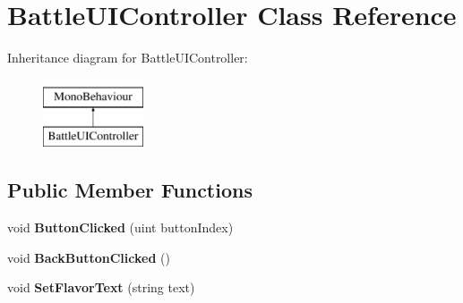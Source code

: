 \hypertarget{class_battle_u_i_controller}{\section{Battle\-U\-I\-Controller Class Reference}
\label{class_battle_u_i_controller}
}
Inheritance diagram for Battle\-U\-I\-Controller\-:\begin{figure}[H]
\begin{center}
\leavevmode
\includegraphics[height=2.000000cm]{class_battle_u_i_controller}
\end{center}
\end{figure}
\subsection*{Public Member Functions}
\begin{DoxyCompactItemize}
\item 
\hypertarget{class_battle_u_i_controller_a8c7cc90f2e90565d988a61531005504d}{void {\bfseries Button\-Clicked} (uint button\-Index)}\label{class_battle_u_i_controller_a8c7cc90f2e90565d988a61531005504d}

\item 
\hypertarget{class_battle_u_i_controller_a7cdd677370faa1526e0774b2b070e6fd}{void {\bfseries Back\-Button\-Clicked} ()}\label{class_battle_u_i_controller_a7cdd677370faa1526e0774b2b070e6fd}

\item 
\hypertarget{class_battle_u_i_controller_a05427e5dab5da5027fd3f12526e7d98c}{void {\bfseries Set\-Flavor\-Text} (string text)}\label{class_battle_u_i_controller_a05427e5dab5da5027fd3f12526e7d98c}

\end{DoxyCompactItemize}
